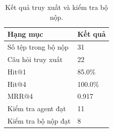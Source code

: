 \begin{longtable}{p{8.5cm}p{5.3cm}}\caption{Kết quả truy xuất và kiểm tra bộ nộp.}\\\toprule Hạng mục & Kết quả\\\midrule
Số tệp trong bộ nộp & 31\\
Câu hỏi truy xuất & 22\\
Hit@1 & 85.0\%\\
Hit@4 & 100.0\%\\
MRR@4 & 0.917\\
Kiểm tra agent đạt & 11\\
Kiểm tra bộ nộp đạt & 8\\\bottomrule\end{longtable}